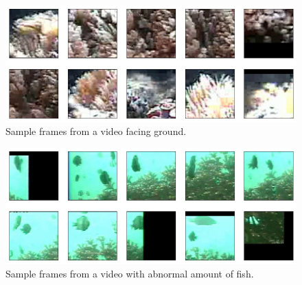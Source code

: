 \documentclass[bsc,logo,twoside,fullspacing,parskip]{infthesis}
\begin{document}
\begin{appendices}
\begin{figure}
\centering
    \includegraphics[scale=0.46]{graph/sample_vegetation.png}
    \caption{Sample frames from a video facing ground.}
    \label{fig:sample_vegetation}
\end{figure}
\begin{figure}
\centering
    \includegraphics[scale=0.46]{graph/sample_fish.png}
    \caption{Sample frames from a video with abnormal amount of fish.}
    \label{fig:sample_fish}
\end{figure}
\end{appendices}
\end{document}
